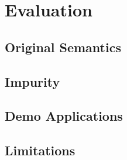 \chapter{Evaluation}
  
  \section{Original Semantics}
  
  \section{Impurity}
  
  \section{Demo Applications}
  
  \section{Limitations}
